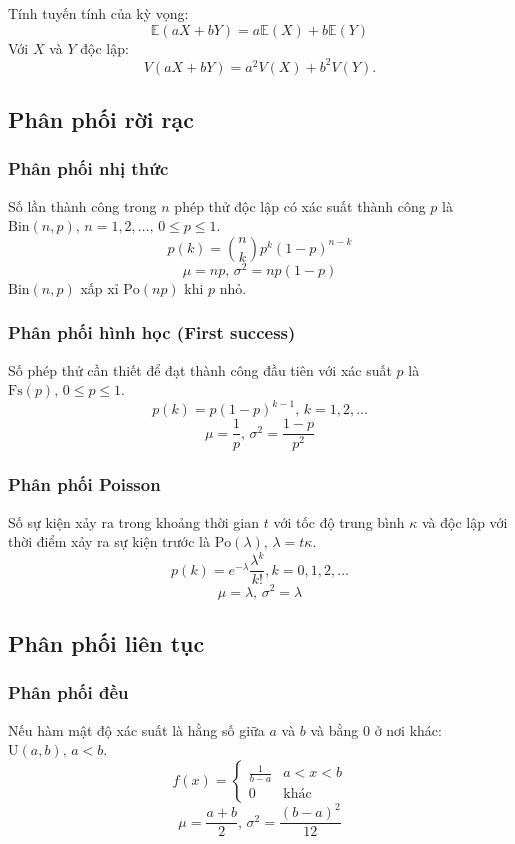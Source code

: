 Tính tuyến tính của kỳ vọng:
\[\mathbb{E}(aX+bY) = a\mathbb{E}(X)+b\mathbb{E}(Y)\]
Với $X$ và $Y$ độc lập: \[V(aX+bY) = a^2V(X)+b^2V(Y).\]

\subsection{Phân phối rời rạc}

\subsubsection{Phân phối nhị thức}
Số lần thành công trong $n$ phép thử độc lập có xác suất thành công $p$ là $\textrm{Bin}(n,p),\,n=1,2,\dots,\, 0\leq p\leq1$.
\[p(k)=\binom{n}{k}p^k(1-p)^{n-k}\]
\[\mu = np,\,\sigma^2=np(1-p)\]
$\textrm{Bin}(n,p)$ xấp xỉ $\textrm{Po}(np)$ khi $p$ nhỏ.

\subsubsection{Phân phối hình học (First success)}
Số phép thử cần thiết để đạt thành công đầu tiên với xác suất $p$ là $\textrm{Fs}(p),\,0\leq p\leq1$.
\[p(k)=p(1-p)^{k-1},\,k=1,2,\dots\]
\[\mu = \frac1p,\,\sigma^2=\frac{1-p}{p^2}\]

\subsubsection{Phân phối Poisson}
Số sự kiện xảy ra trong khoảng thời gian $t$ với tốc độ trung bình $\kappa$ và độc lập với thời điểm xảy ra sự kiện trước là $\textrm{Po}(\lambda),\,\lambda=t\kappa$.
\[p(k)=e^{-\lambda}\frac{\lambda^k}{k!}, k=0,1,2,\dots\]
\[\mu=\lambda,\,\sigma^2=\lambda\]

\subsection{Phân phối liên tục}

\subsubsection{Phân phối đều}
Nếu hàm mật độ xác suất là hằng số giữa $a$ và $b$ và bằng 0 ở nơi khác: $\textrm{U}(a,b),\,a<b$.
\[f(x) = \left\{
\begin{array}{cl}
\frac{1}{b-a} & a<x<b\\
0 & \textrm{khác}
\end{array}\right.\]
\[\mu=\frac{a+b}{2},\,\sigma^2=\frac{(b-a)^2}{12}\]

